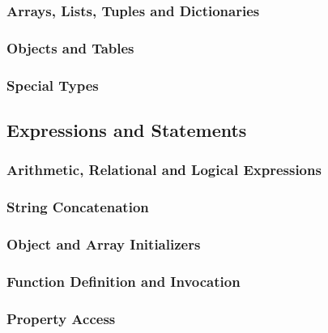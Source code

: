 \subsubsection{Arrays, Lists, Tuples and Dictionaries}

\subsubsection{Objects and Tables}

\subsubsection{Special Types}

\subsection{Expressions and Statements}
\label{exprandstmt}
\subsubsection{Arithmetic, Relational and Logical Expressions}
\subsubsection{String Concatenation}
\subsubsection{Object and Array Initializers}
\subsubsection{Function Definition and Invocation}
\subsubsection{Property Access}
